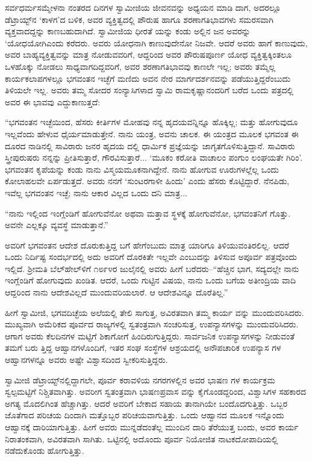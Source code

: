 ಸರ್ವಧರ್ಮಸಮ್ಮೇಳನಾ ನಂತರದ ದಿನಗಳ ಸ್ವಾಮೀಜಿಯ ಜೀವನವನ್ನು ಅಧ್ಯಯನ ಮಾಡಿ ದಾಗ, ಅದರಲ್ಲೂ ಡೆಟ್ರಾಯ್ಟ್​ನ ‘ಕಾಳಗ’ದ ಬಳಿಕ, ಅವರ ವ್ಯಕ್ತಿತ್ವದಲ್ಲಿ ಪೌರುಷ ಹಾಗೂ ಶರಣಾಗತಿಭಾವಗಳು ಸಮರಸವಾಗಿ ವ್ಯಕ್ತವಾದದ್ದನ್ನು ಕಾಣಬಹುದಾಗಿದೆ. ಸ್ವಾಮೀಜಿಯ ಧೀರತೆ ಯನ್ನು ಕಂಡು ಅಲ್ಲಿನ ಜನ ಅವರನ್ನು ‘ಯೋಧಯೋಗಿಎಂದು ಕರೆದರು. ಅವರು ಯೋಧನಾಗಿ ಕಾಣುವುದೇನೋ ನಿಜವೇ. ಆದರೆ ಅವರು ಹಾಗೆ ಕಾಣುವುದು, ಅವರ ಬಾಹ್ಯವ್ಯಕ್ತಿತ್ವವನ್ನು ಮಾತ್ರ ನೋಡುವವರಿಗೆ, ಆದ್ದರಿಂದ ಅವರ ಪೌರುಷಪೂರ್ಣ ಯೋಧ ವ್ಯಕ್ತಿತ್ವಕ್ಕಿಂತಲೂ ಒಳಹೊಕ್ಕು ನೋಡಲು ಸಾಧ್ಯವಾಗದಿದ್ದವರಿಗೆ, ಅವರ ಶರಣಾಗತಿಭಾವವು ಕಾಣಲೇ ಇಲ್ಲ; ಅವರು ತಮ್ಮೆಲ್ಲ ಕಾರ್ಯಕಲಾಪಗಳಲ್ಲೂ ಭಗವಂತನ ಇಚ್ಛೆಗೆ ಮಣಿದು ಅವನ ನೇರ ಮಾರ್ಗದರ್ಶನವನ್ನು ಪಡೆಯುತ್ತಿದ್ದರೆಂಬುದು ತಿಳಿಯಲೇ ಇಲ್ಲ. ಅವರು ತಮ್ಮ ಸೋದರ ಸಂನ್ಯಾಸಿಗಳಾದ ಸ್ವಾಮಿ ರಾಮಕೃಷ್ಣಾನಂದರಿಗೆ ಬರೆದ ಒಂದು ಪತ್ರದಲ್ಲಿ ಅವರ ಈ ಭಾವವು ಎದ್ದುಕಾಣುತ್ತದೆ:

“ಭಗವಂತನ ಇಚ್ಛೆಯಿಂದ, ಹೆಸರು ಕೀರ್ತಿಗಳ ಮೋಹವು ನನ್ನ ಹೃದಯವನ್ನಿನ್ನೂ ಹೊಕ್ಕಿಲ್ಲ; ಮತ್ತು ಹೋಗುವುದೂ ಇಲ್ಲವೆಂದು ಹೇಳುವ ಧೈರ್ಯಮಾಡುತ್ತೇನೆ. ನಾನು ಯಂತ್ರ, ಅವನು ಚಾಲಕ. ಈ ಯಂತ್ರದ ಮೂಲಕ ಭಗವಂತ ಈ ದೂರದ ನಾಡಿನಲ್ಲಿ ಸಾವಿರಾರು ಜನರ ಹೃದಯ ದಲ್ಲಿ ಧಾರ್ಮಿಕ ಪ್ರಜ್ಞೆಯನ್ನು ಜಾಗೃತಗೊಳಿಸುತ್ತಿದ್ದಾನೆ. ಸಾವಿರಾರು ಸ್ತ್ರೀಪುರುಷರು ನನ್ನನ್ನು ಪ್ರೀತಿಸುತ್ತಾರೆ, ಗೌರವಿಸುತ್ತಾರೆ... ‘ಮೂಕಂ ಕರೋತಿ ವಾಚಾಲಂ ಪಂಗುಂ ಲಂಘಯತೇ ಗಿರಿಂ’. ಭಗವಂತನ ಕೃಪೆಯನ್ನು ಕಂಡು ನಾನು ವಿಸ್ಮಯಮೂಕನಾಗಿದ್ದೇನೆ. ನಾನು ಹೋಗುವ ಊರುಗಳಲ್ಲೆಲ್ಲ ಒಂದು ಕೋಲಾಹಲವೇ ಏರ್ಪಡುತ್ತದೆ. ಅವರು ನನಗೆ ‘ಸುಂಟರಗಾಳೀ ಹಿಂದು’ ಎಂದು ಹೆಸರು ಕೊಟ್ಟಿದ್ದಾರೆ. ನೆನಪಿಡು, ಇವೆಲ್ಲ ಭಗವಂತನ ಇಚ್ಛೆ; ನಾನು ಆಕಾರ ವಿಲ್ಲದ ಒಂದು ದನಿ ಮಾತ್ರ...

“ನಾನು ಇಲ್ಲಿಂದ ಇಂಗ್ಲೆಂಡಿಗೆ ಹೋಗುವೆನೋ ಅಥವಾ ಮತ್ತಾವ ಸ್ಥಳಕ್ಕೆ ಹೋಗುವೆನೋ, ಭಗವಂತನಿಗೆ ಗೊತ್ತು. ಅವನೇ ಎಲ್ಲಕ್ಕೂ ವ್ಯವಸ್ಥೆ ಮಾಡುತ್ತಾನೆ.”

ಅವರಿಗೆ ಭಗವಂತನ ಆದೇಶ ದೊರುಕುತ್ತಿದ್ದ ಬಗೆ ಹೇಗೆಂಬುದು ಮಾತ್ರ ಯಾರಿಗೂ ತಿಳಿಯುವಂತಿರಲಿಲ್ಲ. ಆದರೆ ಒಂದು ನಿರ್ದಿಷ್ಟ ಸಂದರ್ಭದಲ್ಲಿ ಅದು ಅವರಿಗೆ ದೊರಕಿತೇ ಇಲ್ಲವೇ ಎಂಬುದನ್ನು ತಿಳಿಸುವ ಅಪೂರ್ವ ಪತ್ರವೊಂದು ಇಲ್ಲಿದೆ. ಶ್ರೀಮತಿ ಬೆಲ್​ಹೇಲ್​ಳಿಗೆ ೧೮೯೪ರ ಜುಲೈನಲ್ಲಿ ಅವರು ಹೀಗೆ ಬರೆದರು–“ಹೆಚ್ಚಿನ ಭಾಗ, ಸದ್ಯದಲ್ಲೇ ನಾನು ಇಂಗ್ಲೆಂಡಿಗೆ ಹೋಗುವುದು ಖಂಡಿತ. ಆದರೆ, ಒಂದು ಗುಟ್ಟಿನ ವಿಷಯ, ನಾನು ಒಂದು ಬಗೆಯ ಅತೀಂದ್ರಿಯ ವಾದಿ  ಆದ್ದರಿಂದ ನಾನು ಆದೇಶವಿಲ್ಲದೆ ಮುಂದುವರಿಯಲಾರೆ. ಆ ಆದೇಶವಿನ್ನೂ ದೊರೆತಿಲ್ಲ.”

ಹೀಗೆ ಸ್ವಾಮೀಜಿ, ಭಗವದಿಚ್ಛೆಯ ಅಲೆಯಲ್ಲಿ ತೇಲಿ ಸಾಗುತ್ತ, ಅವಿರತವಾಗಿ ತಮ್ಮ ಕಾರ್ಯ ವನ್ನು ಮುಂದುವರಿಸಿದರು. ಮುಖ್ಯವಾಗಿ ಅಮೆರಿಕದ ಪೂರ್ವದ ರಾಜ್ಯಗಳಲ್ಲಿ ಸ್ವತಂತ್ರವಾಗಿ ಸಂಚರಿಸುತ್ತ, ಉಪನ್ಯಾಸಗಳನ್ನು ಮುಂದುವರಿಸಿದರು. ಆಗಾಗ ಅವರು ಕೆಲದಿನಗಳ ಮಟ್ಟಿಗೆ ಶಿಕಾಗೋಗೆ ಹಿಂದಿರುಗುತ್ತಿದ್ದರು. ಸಾರ್ವಜನಿಕ ಉಪನ್ಯಾಸಗಳನ್ನು ನೀಡುವಂತೆ ತಮಗೆ ಬರು ತ್ತಿದ್ದ ಆಹ್ವಾನಗಳೊಂದಿಗೆ, ಇತರ ಸಂಘ ಸಂಸ್ಥೆಗಳ ಆಶ್ರಯದಲ್ಲಿ ಅನೌಪಚಾರಿಕ ಉಪನ್ಯಾಸ ಗಳ ಆಹ್ವಾನಗಳನ್ನೂ ಅವರು ಅಷ್ಟೇ ವಿಶ್ವಾಸದಿಂದ ಸ್ವೀಕರಿಸುತ್ತಿದ್ದರು.

ಸ್ವಾಮೀಜಿ ಡೆಟ್ರಾಯ್ಟ್​ನಲ್ಲಿದ್ದಾಗಲೇ, ಪೂರ್ವ ಕರಾವಳಿಯ ನಗರಗಳಲ್ಲಿನ ಅವರ ಭಾಷಣ ಗಳ ಕಾರ್ಯಕ್ರಮ ಸ್ವಲ್ಪಮಟ್ಟಿಗೆ ನಿಶ್ಚಿತವಾಗಿತ್ತು. ಅವರೀಗ ಸ್ವತಂತ್ರವಾಗಿ ಭಾಷಣಪ್ರವಾಸ ವನ್ನು ಕೈಗೊಂಡದ್ದರಿಂದ, ವಿಶ್ವಾಸಿಗಳ ಸಹಕಾರದ ಅಗತ್ಯ ಮೊದಲಿಗಿಂತ ಹೆಚ್ಚಾಗಿತ್ತು. ಆದರೆ ಅವರಿಗೆ ಬೇಕಾದ ಸಹಾಯ ತಾನಾಗಿಯೇ ಬಂದೊದಗುತ್ತಿತ್ತು. ಒಬ್ಬರ ಜೊತೆಗಾದ ಪರಿಚಯ ದಿಂದಾಗಿ ಮತ್ತೊಬ್ಬರ ಪರಿಚಯವಾಗುತ್ತಿತ್ತು. ಒಂದು ಆಹ್ವಾನದ ಮೂಲಕ ಇನ್ನೊಂದು ಆಹ್ವಾನಕ್ಕೆ ದಾರಿಯಾಗುತ್ತಿತ್ತು. ಹೀಗೆ ಅವರು ಮುನ್ನಡೆದಂತೆಲ್ಲ ಮುಂದಿನ ದಾರಿ ತೆರೆಯುತ್ತ ಬಂದು, ಅವರ ಕಾರ್ಯ ನಿರಾತಂಕವಾಗಿ, ಅವಿರತವಾಗಿ ಸಾಗಿತು. ಒಟ್ಟಿನಲ್ಲಿ ಅದೊಂದು ಪೂರ್ವ ನಿಯೋಜಿತ ನಾಟಕದೋಪಾದಿಯಲ್ಲಿ ನಡೆದುಕೊಂಡು ಹೋಗುತ್ತಿತ್ತು.

